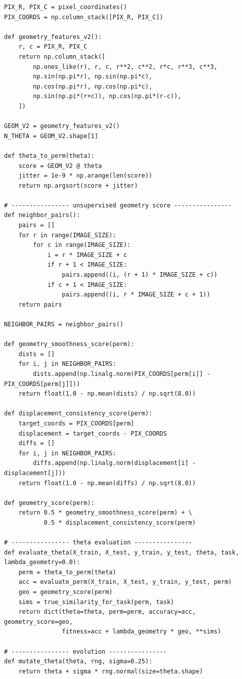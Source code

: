 \documentclass[11pt,a4paper]{report}
\begin{document}
\begin{lstlisting}[style=python,caption={Unified Python code for Meta-SBOHN v5/v6 tests.}]
PIX_R, PIX_C = pixel_coordinates()
PIX_COORDS = np.column_stack([PIX_R, PIX_C])

def geometry_features_v2():
    r, c = PIX_R, PIX_C
    return np.column_stack([
        np.ones_like(r), r, c, r**2, c**2, r*c, r**3, c**3,
        np.sin(np.pi*r), np.sin(np.pi*c),
        np.cos(np.pi*r), np.cos(np.pi*c),
        np.sin(np.pi*(r+c)), np.cos(np.pi*(r-c)),
    ])

GEOM_V2 = geometry_features_v2()
N_THETA = GEOM_V2.shape[1]

def theta_to_perm(theta):
    score = GEOM_V2 @ theta
    jitter = 1e-9 * np.arange(len(score))
    return np.argsort(score + jitter)

# ---------------- unsupervised geometry score ----------------
def neighbor_pairs():
    pairs = []
    for r in range(IMAGE_SIZE):
        for c in range(IMAGE_SIZE):
            i = r * IMAGE_SIZE + c
            if r + 1 < IMAGE_SIZE:
                pairs.append((i, (r + 1) * IMAGE_SIZE + c))
            if c + 1 < IMAGE_SIZE:
                pairs.append((i, r * IMAGE_SIZE + c + 1))
    return pairs

NEIGHBOR_PAIRS = neighbor_pairs()

def geometry_smoothness_score(perm):
    dists = []
    for i, j in NEIGHBOR_PAIRS:
        dists.append(np.linalg.norm(PIX_COORDS[perm[i]] - PIX_COORDS[perm[j]]))
    return float(1.0 - np.mean(dists) / np.sqrt(8.0))

def displacement_consistency_score(perm):
    target_coords = PIX_COORDS[perm]
    displacement = target_coords - PIX_COORDS
    diffs = []
    for i, j in NEIGHBOR_PAIRS:
        diffs.append(np.linalg.norm(displacement[i] - displacement[j]))
    return float(1.0 - np.mean(diffs) / np.sqrt(8.0))

def geometry_score(perm):
    return 0.5 * geometry_smoothness_score(perm) + \
           0.5 * displacement_consistency_score(perm)

# ---------------- theta evaluation ----------------
def evaluate_theta(X_train, X_test, y_train, y_test, theta, task, lambda_geometry=0.0):
    perm = theta_to_perm(theta)
    acc = evaluate_perm(X_train, X_test, y_train, y_test, perm)
    geo = geometry_score(perm)
    sims = true_similarity_for_task(perm, task)
    return dict(theta=theta, perm=perm, accuracy=acc, geometry_score=geo,
                fitness=acc + lambda_geometry * geo, **sims)

# ---------------- evolution ----------------
def mutate_theta(theta, rng, sigma=0.25):
    return theta + sigma * rng.normal(size=theta.shape)


\end{lstlisting}
\end{document}
